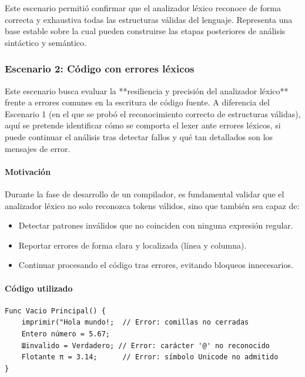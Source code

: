 \documentclass{article}
\begin{document}
Este escenario permitió confirmar que el analizador léxico reconoce de forma correcta y exhaustiva todas las estructuras válidas del lenguaje. Representa una base estable sobre la cual pueden construirse las etapas posteriores de análisis sintáctico y semántico.


\subsubsection{Escenario 2: Código con errores léxicos}

Este escenario busca evaluar la **resiliencia y precisión del analizador léxico** frente a errores comunes en la escritura de código fuente. A diferencia del Escenario 1 (en el que se probó el reconocimiento correcto de estructuras válidas), aquí se pretende identificar cómo se comporta el lexer ante errores léxicos, si puede continuar el análisis tras detectar fallos y qué tan detallados son los mensajes de error.

\paragraph{Motivación}

Durante la fase de desarrollo de un compilador, es fundamental validar que el analizador léxico no solo reconozca tokens válidos, sino que también sea capaz de:

\begin{itemize}
  \item Detectar patrones inválidos que no coinciden con ninguna expresión regular.
  \item Reportar errores de forma clara y localizada (línea y columna).
  \item Continuar procesando el código tras errores, evitando bloqueos innecesarios.
\end{itemize}

\paragraph{Código utilizado}

\begin{lstlisting}[style=mypython, caption={Fragmento con errores léxicos intencionados}]
Func Vacio Principal() {
    imprimir("Hola mundo!;  // Error: comillas no cerradas
    Entero número = 5.67;
    Шinvalido = Verdadero; // Error: carácter '@' no reconocido
    Flotante π = 3.14;      // Error: símbolo Unicode no admitido
}
\end{lstlisting}
\end{document}
